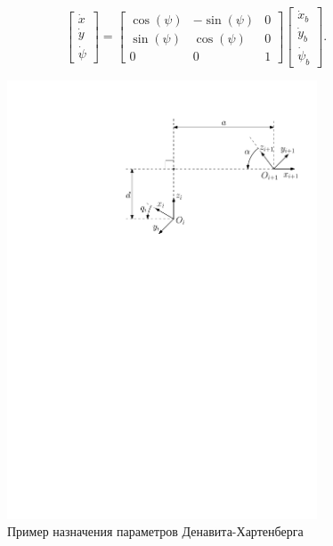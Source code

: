 \documentclass[14pt, a4paper]{extreport}
\begin{document}
\begin{equation}
\begin{bmatrix}
\dot{x}\\[1mm] \dot{y}\\[1mm] \dot{\psi}
\end{bmatrix}
= 
\begin{bmatrix}
\cos(\psi) & -\sin(\psi) & 0\\[1mm]
\sin(\psi) & \cos(\psi) & 0\\[1mm]
0 & 0 & 1
\end{bmatrix}
\begin{bmatrix}
\dot{x}_b\\[1mm] \dot{y}_b\\[1mm] \dot{\psi}_b
\end{bmatrix}\!.
\tag{42} \label{eq:42}
\end{equation}
\newpage
\begin{figure}[!h]
\centering
\captionsetup{justification=centering}
\renewcommand{\figurename}{Рисунок}
\includegraphics[width=0.82\textwidth]{DH.pdf}	%
\caption{Пример назначения параметров Денавита-Хартенберга}
\label{pic:7}
\end{figure}
\end{document}
